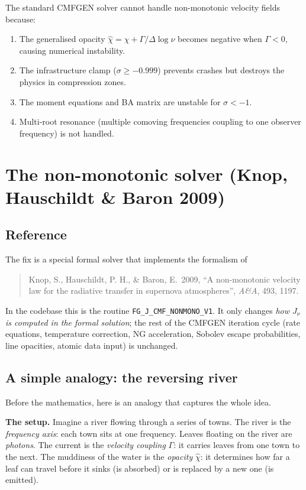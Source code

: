 \documentclass[11pt]{article}
\begin{document}
The standard CMFGEN solver cannot handle non-monotonic velocity fields
because:
\begin{enumerate}[nosep]
  \item The generalised opacity
        $\hat\chi = \chi + \Gamma/\Delta\log\nu$ becomes negative when
        $\Gamma < 0$, causing numerical instability.
  \item The infrastructure clamp ($\sigma \ge -0.999$) prevents crashes
        but destroys the physics in compression zones.
  \item The moment equations and BA matrix are unstable for
        $\sigma < -1$.
  \item Multi-root resonance (multiple comoving frequencies coupling to
        one observer frequency) is not handled.
\end{enumerate}

\section{The non-monotonic solver (Knop, Hauschildt \& Baron 2009)}

\subsection{Reference}

The fix is a special formal solver that implements the formalism of

\begin{quote}
  Knop, S., Hauschildt, P. H., \& Baron, E.\ 2009,
  ``A non-monotonic velocity law for the radiative transfer in
  supernova atmospheres'', \emph{A\&A}, 493, 1197.
\end{quote}

In the codebase this is the routine
\texttt{FG\_J\_CMF\_NONMONO\_V1}.  It only changes \emph{how $J_\nu$ is
computed in the formal solution}; the rest of the CMFGEN iteration cycle
(rate equations, temperature correction, NG acceleration, Sobolev
escape probabilities, line opacities, atomic data input) is unchanged.

\subsection{A simple analogy: the reversing river}
\label{sec:analogy}

Before the mathematics, here is an analogy that captures the whole idea.

\medskip\noindent
\textbf{The setup.}\quad
Imagine a river flowing through a series of towns.  The river is the
\emph{frequency axis}: each town sits at one frequency.  Leaves floating
on the river are \emph{photons}.  The current is the
\emph{velocity coupling} $\Gamma$: it carries leaves from one town to
the next.  The muddiness of the water is the \emph{opacity} $\hat\chi$:
it determines how far a leaf can travel before it sinks (is absorbed) or
is replaced by a new one (is emitted).
\end{document}
